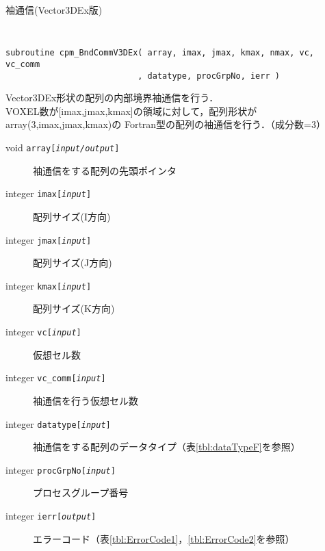 \begin{spacing}{0.8}
\begin{itembox}[l]{袖通信(Vector3DEx版)}
{\tt
\begin{verbatim}
subroutine cpm_BndCommV3DEx( array, imax, jmax, kmax, nmax, vc, vc_comm
                           , datatype, procGrpNo, ierr )
\end{verbatim}
}
Vector3DEx形状の配列の内部境界袖通信を行う．\\
VOXEL数が[imax,jmax,kmax]の領域に対して，配列形状がarray(3,imax,jmax,kmax)の
Fortran型の配列の袖通信を行う．（成分数=3）
\begin{description}
\item[void    {\tt array[{\it input/output}]}] 袖通信をする配列の先頭ポインタ
\item[integer {\tt imax[{\it input}]}] 配列サイズ(I方向)
\item[integer {\tt jmax[{\it input}]}] 配列サイズ(J方向)
\item[integer {\tt kmax[{\it input}]}] 配列サイズ(K方向)
\item[integer {\tt vc[{\it input}]}] 仮想セル数
\item[integer {\tt vc\_comm[{\it input}]}] 袖通信を行う仮想セル数
\item[integer {\tt datatype[{\it input}]}] 袖通信をする配列のデータタイプ（表\ref{tbl:dataTypeF}を参照）
\item[integer {\tt procGrpNo[{\it input}]}] プロセスグループ番号
\item[integer {\tt ierr[{\it output}]}] エラーコード（表\ref{tbl:ErrorCode1}，\ref{tbl:ErrorCode2}を参照）
\end{description}
\end{itembox}\\
\end{spacing}

